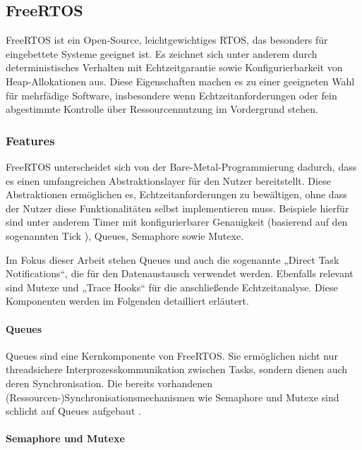 \subsection{FreeRTOS}

FreeRTOS ist ein Open-Source, leichtgewichtiges \ac{RTOS}, das besonders für
eingebettete Systeme geeignet ist. Es zeichnet sich unter anderem durch
deterministisches Verhalten mit Echtzeitgarantie sowie Konfigurierbarkeit von
Heap-Allokationen aus. Diese Eigenschaften machen es zu einer geeigneten Wahl
für mehrfädige Software, insbesondere wenn Echtzeitanforderungen oder fein
abgestimmte Kontrolle über Ressourcennutzung im Vordergrund stehen.

\subsubsection{Features}

FreeRTOS unterscheidet sich von der Bare-Metal-Programmierung dadurch, dass es
einen umfangreichen Abstraktionslayer für den Nutzer bereitstellt. Diese
Abstraktionen ermöglichen es, Echtzeitanforderungen zu bewältigen, ohne dass der
Nutzer diese Funktionalitäten selbst implementieren muss. Beispiele hierfür sind
unter anderem Timer mit konfigurierbarer Genauigkeit (basierend auf den
sogenannten Tick \cite{freertos_rtos_tick, freertos_tick_resolution}), Queues,
Semaphore sowie Mutexe.

Im Fokus dieser Arbeit stehen Queues und auch die sogenannte „Direct Task
Notifications“, die für den Datenaustausch verwendet werden. Ebenfalls relevant
sind Mutexe und „Trace Hooks“ für die anschließende Echtzeitanalyse. Diese
Komponenten werden im Folgenden detailliert erläutert.

\paragraph{Queues}

Queues sind eine Kernkomponente von FreeRTOS. Sie ermöglichen nicht nur
threadsichere Interprozesskommunikation zwischen Tasks, sondern dienen auch
deren Synchronisation. Die bereits vorhandenen
(Ressourcen-)Synchronisationsmechanismen wie Semaphore und Mutexe sind schlicht
auf Queues aufgebaut \cite{freertos_semphr_incl}.

\paragraph{Semaphore und Mutexe} \label{sec:mutex}

